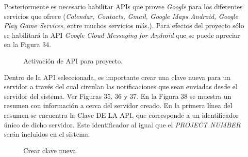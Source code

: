 Posteriormente es necesario habilitar APIs que provee \textit{Google} para los diferentes servicios que ofrece (\textit{Calendar, Contacts, Gmail, Google Maps Android, Google Play Game Services}, entre muchos servicios más.). Para efectos del proyecto sólo se habilitará la API \textit{Google Cloud Messaging for Android} que se puede apreciar en la Figura 34.\\

\begin{figure}[H]
\centering
\setlength\fboxsep{0pt}
\setlength\fboxrule{0.5pt}
\caption{Activación de API para proyecto.}
\label{API}
\end{figure}

Dentro de la API seleccionada, es importante crear una clave nueva para un servidor a través del cual circulan las notificaciones que sean enviadas desde el servidor del sistema. Ver Figuras 35, 36 y 37. En la Figura 38 se muestra un resumen con información a cerca del servidor creado. En la primera línea del resumen se encuentra la Clave DE LA API, que corresponde a un identificador único de dicho servidor. Este identificador al igual que el \textit{PROJECT NUMBER} serán incluidos en el sistema. \\

\begin{figure}[H]
\centering
\setlength\fboxsep{0pt}
\setlength\fboxrule{0.5pt}
\caption{Crear clave nueva.}
\label{cuentaNueva}
\end{figure}

